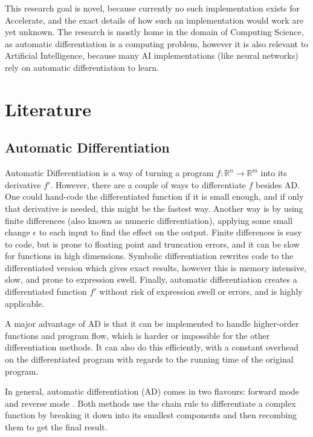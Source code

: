 \documentclass{article}
\begin{document}
        This research goal is novel, because currently no such implementation exists for Accelerate, and the exact details of how such an implementation would work are yet unknown.
        The research is mostly home in the domain of Computing Science, as automatic differentiation is a computing problem, however it is also relevant to Artificial Intelligence, because many AI implementations (like neural networks) rely on automatic differentiation to learn.

    \section{Literature} \label{sec:literature}
        \subsection{Automatic Differentiation}
            Automatic Differentiation is a way of turning a program $f:\mathbb{R}^n\to\mathbb{R}^m$ into its derivative $f'$.
            However, there are a couple of ways to differentiate $f$ besides AD.
            One could hand-code the differentiated function if it is small enough, and if only that derivative is needed, this might be the fastest way.
            Another way is by using finite differences (also known as numeric differentiation), applying some small change $\epsilon$ to each input to find the effect on the output.
            Finite differences is easy to code, but is prone to floating point and truncation errors, and it can be slow for functions in high dimensions.
            Symbolic differentiation rewrites code to the differentiated version which gives exact results, however this is memory intensive, slow, and prone to expression swell.
            Finally, automatic differentiation creates a differentiated function $f'$ without risk of expression swell or errors, and is highly applicable.

            A major advantage of AD is that it can be implemented to handle higher-order functions and program flow, which is harder or impossible for the other differentiation methods.
            It can also do this efficiently, with a constant overhead on the differentiated program with regards to the running time of the original program.
            
            In general, automatic differentiation (AD) comes in two flavours: forward mode and reverse mode \cite{margossian2019review, elliot2018essence}.
            Both methods use the chain rule to differentiate a complex function by breaking it down into its smallest components and then recombing them to get the final result.
\end{document}
